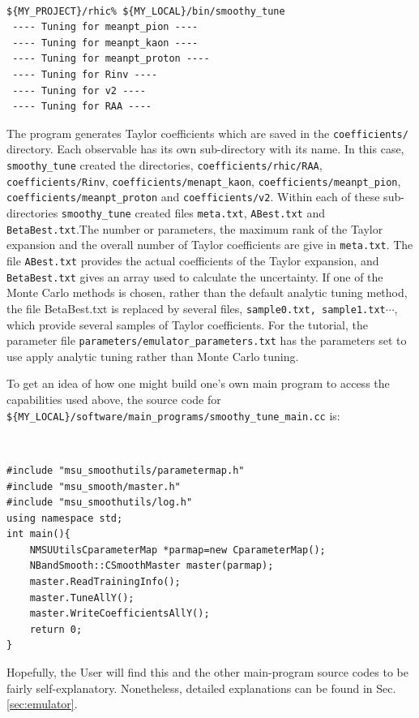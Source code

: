 \documentclass[UserManual.tex]{subfiles}
\begin{document}
{\tt
\begin{verbatim}
${MY_PROJECT}/rhic% ${MY_LOCAL}/bin/smoothy_tune
 ---- Tuning for meanpt_pion ----
 ---- Tuning for meanpt_kaon ----
 ---- Tuning for meanpt_proton ----
 ---- Tuning for Rinv ----
 ---- Tuning for v2 ----
 ---- Tuning for RAA ----
\end{verbatim}
}
The program generates Taylor coefficients which are saved in the {\tt coefficients/} directory. Each observable has its own sub-directory with its name. In this case, {\tt smoothy\_tune} created the directories, {\tt coefficients/rhic/RAA}, {\tt coefficients/Rinv}, {\tt coefficients/menapt\_kaon}, {\tt coefficients/meanpt\_pion}, {\tt coefficients/meanpt\_proton} and {\tt coefficients/v2}. Within each of these sub-directories {\tt smoothy\_tune} created files {\tt meta.txt}, {\tt ABest.txt} and {\tt BetaBest.txt}.The number or parameters, the maximum rank of the Taylor expansion and the overall number of Taylor coefficients are give in {\tt meta.txt}. The file {\tt ABest.txt} provides the actual coefficients of the Taylor expansion, and {\tt BetaBest.txt} gives an array used to calculate the uncertainty. If one of the Monte Carlo methods is chosen, rather than the default analytic tuning method, the file {BetaBest.txt} is replaced by several files, {\tt sample0.txt, sample1.txt}$\cdots$, which provide several samples of Taylor coefficients. For the tutorial, the parameter file {\tt parameters/emulator\_parameters.txt} has the parameters set to use apply analytic tuning rather than Monte Carlo tuning.

To get an idea of how one might build one's own main program to access the capabilities used above, the source code for {\tt \$\{MY\_LOCAL\}/software/main\_programs/smoothy\_tune\_main.cc} is:
{\tt
\begin{verbatim}
#include "msu_smoothutils/parametermap.h"
#include "msu_smooth/master.h"
#include "msu_smoothutils/log.h"
using namespace std;
int main(){
	NMSUUtilsCparameterMap *parmap=new CparameterMap();
	NBandSmooth::CSmoothMaster master(parmap);	
	master.ReadTrainingInfo();
	master.TuneAllY();
	master.WriteCoefficientsAllY();
	return 0;
}
\end{verbatim}}
Hopefully, the User will find this and the other main-program source codes to be fairly self-explanatory. Nonetheless, detailed explanations can be found in Sec. \ref{sec:emulator}.
\end{document}

